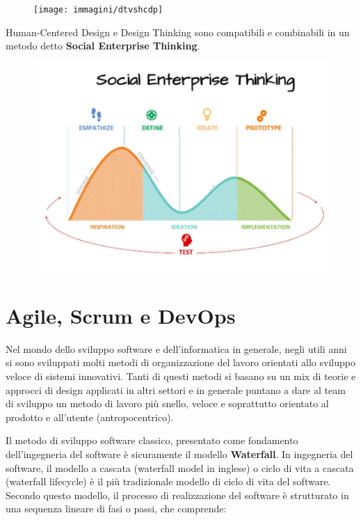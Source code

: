 \begin{figure}[!h]
	\centering
	\texttt{[image: immagini/dtvshcdp]}
\end{figure}

Human-Centered Design e Design Thinking sono compatibili e combinabili in un metodo detto \textbf{Social Enterprise Thinking}.

\begin{figure}[!h]
	\centering
	\includegraphics[scale=0.5]{immagini/social-enterprise-thinking.png}
\end{figure}

\section{Agile, Scrum e DevOps}
Nel mondo dello sviluppo software e dell'informatica in generale, negli utili anni si sono sviluppati molti metodi di organizzazione del lavoro
orientati allo sviluppo veloce di sistemi innovativi. Tanti di questi metodi si basano su un mix di teorie e approcci di design applicati in altri
settori e in generale puntano a dare al team di sviluppo un metodo di lavoro più snello, veloce e soprattutto orientato al prodotto e all'utente
(antropocentrico).

Il metodo di sviluppo software classico, presentato come fondamento dell'ingegneria del software è sicuramente il modello \textbf{Waterfall}.
In ingegneria del software, il modello a cascata (waterfall model in inglese) o ciclo di vita a cascata (waterfall lifecycle) è il più tradizionale
modello di ciclo di vita del software. Secondo questo modello, il processo di realizzazione del software è strutturato in una sequenza lineare di
fasi o passi, che comprende:

